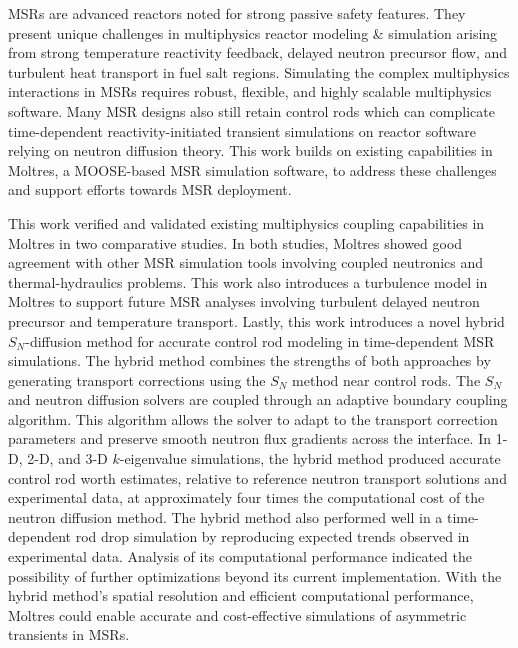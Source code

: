 \glspl{MSR} are advanced reactors noted for strong passive safety features.
They present unique challenges in multiphysics reactor modeling \& simulation arising from
strong temperature reactivity feedback, delayed neutron precursor flow, and turbulent heat transport
in fuel salt regions. Simulating the complex multiphysics interactions in
\glspl{MSR} requires robust, flexible, and highly scalable multiphysics software. Many \gls{MSR}
designs also still retain control rods which can complicate time-dependent reactivity-initiated
transient simulations on reactor software relying on neutron diffusion theory.
This work builds on existing capabilities in Moltres, a MOOSE-based \gls{MSR} simulation software,
to address these challenges and support efforts towards \gls{MSR} deployment.

This work verified and validated existing multiphysics coupling capabilities in Moltres in two
comparative studies. In both studies, Moltres showed good agreement with other \gls{MSR} simulation tools
involving coupled neutronics and thermal-hydraulics problems. This work also introduces a
turbulence model in Moltres to support future \gls{MSR} analyses involving turbulent delayed
neutron precursor and temperature transport. Lastly, this work introduces a novel hybrid
$S_N$-diffusion method for accurate control rod modeling in time-dependent \gls{MSR} simulations.
The hybrid method combines the strengths of both approaches by generating transport corrections
using the $S_N$ method near control rods. The $S_N$ and neutron diffusion solvers are coupled
through an adaptive boundary coupling algorithm. This algorithm allows the solver to adapt to the
transport correction parameters and preserve smooth neutron flux gradients across the interface.
In 1-D, 2-D, and 3-D $k$-eigenvalue simulations, the hybrid method produced accurate control
rod worth estimates, relative to reference neutron transport solutions and experimental data,
at approximately four times the computational cost of the neutron diffusion method.
The hybrid method also performed well in a time-dependent rod drop simulation
by reproducing expected trends observed in experimental data.
Analysis of its computational performance indicated the possibility of further optimizations
beyond its current implementation. With the hybrid method's spatial resolution and
efficient computational performance, Moltres could enable accurate and cost-effective simulations
of asymmetric transients in \glspl{MSR}.
